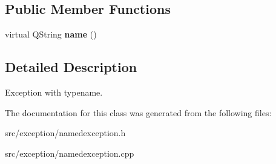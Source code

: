 \subsection*{Public Member Functions}
\begin{DoxyCompactItemize}
\item 
\mbox{\label{classNamedException_a850b410131d13243a924e75a27d9b889}} 
virtual Q\+String {\bfseries name} ()
\end{DoxyCompactItemize}


\subsection{Detailed Description}
Exception with typename. 

The documentation for this class was generated from the following files\+:\begin{DoxyCompactItemize}
\item 
src/exception/namedexception.\+h\item 
src/exception/namedexception.\+cpp\end{DoxyCompactItemize}
